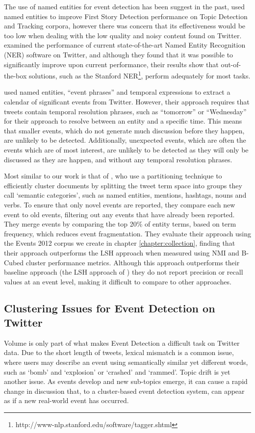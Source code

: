 The use of named entities for event detection has been suggest in the past,  \cite{Kumaran:2004:TCN:1008992.1009044} used named entities to improve First Story Detection performance on Topic Detection and Tracking corpora, however there was concern that its effectiveness would be too low when dealing with the low quality and noisy content found on Twitter. \cite{DBLP:conf/sigir/LiWHYDSL12} examined the performance of current state-of-the-art Named Entity Recognition (NER) software on Twitter, and although they found that it was possible to significantly improve upon current performance, their results show that out-of-the-box solutions, such as the Stanford NER\footnote{http://www-nlp.stanford.edu/software/tagger.shtml}, perform adequately for most tasks.

\cite{Ritter:2012:ODE:2339530.2339704} used named entities, ``event phrases'' and temporal expressions to extract a calendar of significant events from Twitter.
However, their approach requires that tweets contain temporal resolution phrases, such as ``tomorrow'' or ``Wednesday'' for their approach to resolve between an entity and a specific time.
This means that smaller events, which do not generate much discussion before they happen, are unlikely to be detected.
Additionally, unexpected events, which are often the events which are of most interest, are unlikely to be detected as they will only be discussed as they are happen, and without any temporal resolution phrases.

Most similar to our work is that of \cite{Reuters2017}, who use a partitioning technique to efficiently cluster documents by splitting the tweet term space into groups they call `semantic categories', such as named entities, mentions, hashtags, nouns and verbs.
To ensure that only novel events are reported, they compare each new event to old events, filtering out any events that have already been reported.
They merge events by comparing the top 20\% of entity terms, based on term frequency, which reduces event fragmentation.
They evaluate their approach using the Events 2012 corpus we create in chapter \ref{chapter:collection}, finding that their approach outperforms the LSH approach when measured using NMI and B-Cubed cluster performance metrics.
Although this approach outperforms their baseline approach (the LSH approach of \cite{Petrovic:2010:SFS:1857999.1858020}) they do not report precision or recall values at an event level, making it difficult to compare to other approaches.

\subsection{Clustering Issues for Event Detection on Twitter}
Volume is only part of what makes Event Detection a difficult task on Twitter data.
Due to the short length of tweets, lexical mismatch is a common issue, where users may describe an event using semantically similar yet different words, such as `bomb' and `explosion' or `crashed' and `rammed'.
Topic drift is yet another issue.
As events develop and new sub-topics emerge, it can cause a rapid change in discussion that, to a cluster-based event detection system, can appear as if a new real-world event has occurred.

